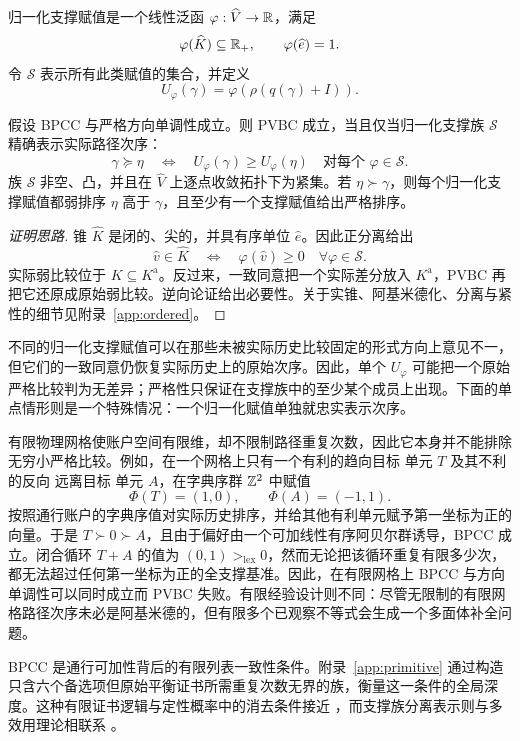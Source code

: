 归一化支撑赋值是一个线性泛函 $\varphi:\widehat V\to\mathbb R$，满足
\[
 \varphi(\widehat K)\subseteq\mathbb R_+,
 \qquad
 \varphi(\widehat e)=1.
\]
令 $\mathcal S$ 表示所有此类赋值的集合，并定义
\[
 U_\varphi(\gamma)=\varphi\!\left(\rho(q(\gamma)+I)\right).
\]

\begin{theorem}[实际历史上的成对实数分离]\label{thm:A}
假设 BPCC 与严格方向单调性成立。则 PVBC 成立，当且仅当归一化支撑族 $\mathcal S$ 精确表示实际路径次序：
\[
 \gamma\succeq\eta
 \quad\Longleftrightarrow\quad
 U_\varphi(\gamma)\ge U_\varphi(\eta)
 \quad\text{对每个 }\varphi\in\mathcal S.
\]
族 $\mathcal S$ 非空、凸，并且在 $\widehat V$ 上逐点收敛拓扑下为紧集。若 $\eta\succ\gamma$，则每个归一化支撑赋值都弱排序 $\eta$ 高于 $\gamma$，且至少有一个支撑赋值给出严格排序。
\end{theorem}

\begin{proof}[证明思路]
锥 $\widehat K$ 是闭的、尖的，并具有序单位 $\widehat e$。因此正分离给出
\[
 \widehat v\in\widehat K
 \quad\Longleftrightarrow\quad
 \varphi(\widehat v)\ge0\quad\forall\varphi\in\mathcal S.
\]
实际弱比较位于 $K\subseteq K^{\mathrm a}$。反过来，一致同意把一个实际差分放入 $K^{\mathrm a}$，PVBC 再把它还原成原始弱比较。逆向论证给出必要性。关于实锥、阿基米德化、分离与紧性的细节见附录~\ref{app:ordered}。
\end{proof}

不同的归一化支撑赋值可以在那些未被实际历史比较固定的形式方向上意见不一，但它们的一致同意仍恢复实际历史上的原始次序。因此，单个 $U_\varphi$ 可能把一个原始严格比较判为无差异；严格性只保证在支撑族中的至少某个成员上出现。下面的单点情形则是一个特殊情况：一个归一化赋值单独就忠实表示次序。

\begin{remark}\label{rem:finitegrid-pvbc}
有限物理网格使账户空间有限维，却不限制路径重复次数，因此它本身并不能排除无穷小严格比较。例如，在一个网格上只有一个有利的趋向目标 单元 $T$ 及其不利的反向 远离目标 单元 $A$，在字典序群 $\mathbb Z^2$ 中赋值
\[
 \Phi(T)=(1,0),
 \qquad
 \Phi(A)=(-1,1).
\]
按照通行账户的字典序值对实际历史排序，并给其他有利单元赋予第一坐标为正的向量。于是 $T\succ0\succ A$，且由于偏好由一个可加线性有序阿贝尔群诱导，BPCC 成立。闭合循环 $T+A$ 的值为 $(0,1)>_{\mathrm{lex}}0$，然而无论把该循环重复有限多少次，都无法超过任何第一坐标为正的全支撑基准。因此，在有限网格上 BPCC 与方向单调性可以同时成立而 PVBC 失败。有限经验设计则不同：尽管无限制的有限网格路径次序未必是阿基米德的，但有限多个已观察不等式会生成一个多面体补全问题。
\end{remark}

BPCC 是通行可加性背后的有限列表一致性条件。附录~\ref{app:primitive} 通过构造只含六个备选项但原始平衡证书所需重复次数无界的族，衡量这一条件的全局深度。这种有限证书逻辑与定性概率中的消去条件接近 \citep{KraftPrattSeidenberg1959,ChateauneufJaffray1984}，而支撑族分离表示则与多效用理论相联系 \citep{Ok2002,DubraMaccheroniOk2004,EvrenOk2011}。
